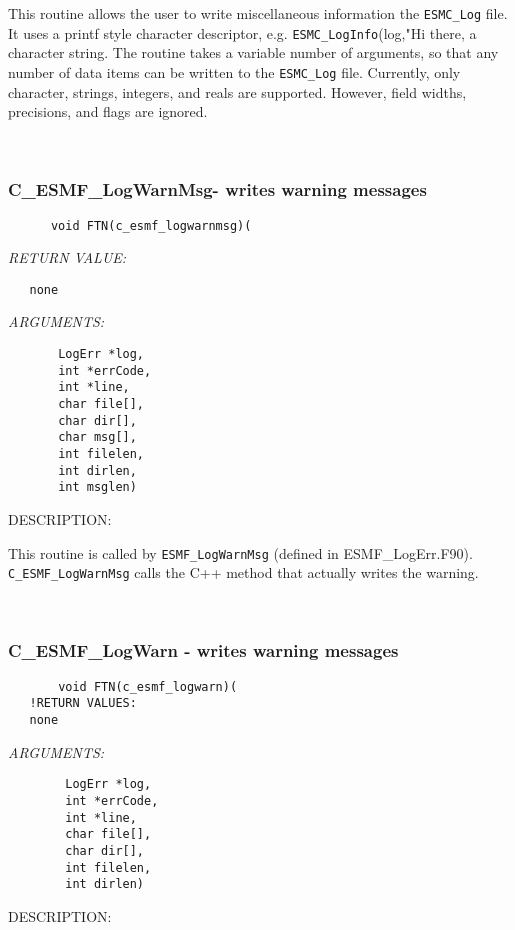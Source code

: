     This routine allows the user to write miscellaneous information the
    {\tt ESMC\_Log} file. It uses a printf style character descriptor, e.g. 
    {\tt ESMC\_LogInfo}(log,"Hi there, %
    a character string. The routine takes a variable number of arguments,
    so that any number of data items can be written to the {\tt ESMC\_Log} file.
    Currently, only character, strings, integers, and reals are supported.
    However, field widths, precisions, and flags are ignored.
   
 
\mbox{}\hrulefill\ 
 
\subsubsection [C\_ESMF\_LogWarnMsg-] {C\_ESMF\_LogWarnMsg- writes warning messages}


  
\begin{verbatim}      void FTN(c_esmf_logwarnmsg)(\end{verbatim}{\em RETURN VALUE:}
\begin{verbatim}   none\end{verbatim}{\em ARGUMENTS:}
\begin{verbatim}       LogErr *log,
       int *errCode,
       int *line,
       char file[],
       char dir[],
       char msg[],
       int filelen,
       int dirlen,
       int msglen)\end{verbatim}
{\sf DESCRIPTION:\\ }


      This routine is called by {\tt ESMF\_LogWarnMsg} (defined in ESMF\_LogErr.F90).  
      {\tt C\_ESMF\_LogWarnMsg} calls the C++ method that actually writes the warning.
   
 
\mbox{}\hrulefill\ 
 
\subsubsection [C\_ESMF\_LogWarn] {C\_ESMF\_LogWarn - writes warning messages}


  
\begin{verbatim}       void FTN(c_esmf_logwarn)(
   !RETURN VALUES:
   none\end{verbatim}{\em ARGUMENTS:}
\begin{verbatim}        LogErr *log,
        int *errCode,
        int *line,
        char file[],
        char dir[],
        int filelen,
        int dirlen)\end{verbatim}
{\sf DESCRIPTION:\\ }


